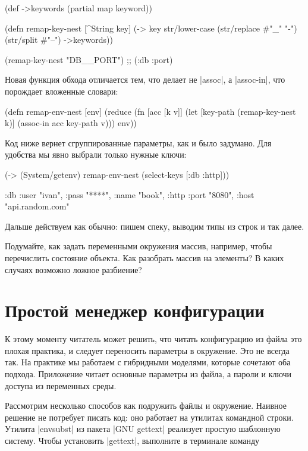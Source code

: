 \begin{code}
(def ->keywords (partial map keyword))

(defn remap-key-nest
  [^String key]
  (-> key
      str/lower-case
      (str/replace #"_" "-")
      (str/split #"--")
      ->keywords))

(remap-key-nest "DB__PORT")
;; (:db :port)
\end{code}

Новая функция обхода отличается тем, что делает не \spverb|assoc|, а \spverb|assoc-in|, что
порождает вложенные словари:

\begin{code}
(defn remap-env-nest
  [env]
  (reduce
   (fn [acc [k v]]
     (let [key-path (remap-key-nest k)]
       (assoc-in acc key-path v)))
   {}
   env))
\end{code}

Код ниже вернет сгруппированные параметры, как и было задумано. Для удобства мы
явно выбрали только нужные ключи:

\begin{code}
(-> (System/getenv)
    remap-env-nest
    (select-keys [:db :http]))

{:db {:user "ivan", :pass "****", :name "book"},
 :http {:port "8080", :host "api.random.com"}}
\end{code}

Дальше действуем как обычно: пишем спеку, выводим типы из строк и так далее.

Подумайте, как задать переменными окружения массив, например, чтобы перечислить
состояние объекта. Как разобрать массив на элементы? В каких случаях возможно
ложное разбиение?

\section{Простой менеджер конфигурации}

К этому моменту читатель может решить, что читать конфигурацию из файла это
плохая практика, и следует переносить параметры в окружение. Это не всегда
так. На практике мы работаем с гибридными моделями, которые сочетают оба
подхода. Приложение читает основные параметры из файла, а пароли и ключи доступа
из переменных среды.

Рассмотрим несколько способов как подружить файлы и окружение. Наивное решение
не потребует писать код: оно работает на утилитах командной строки. Утилита
\spverb|envsubst| из пакета \spverb|GNU gettext| реализует простую шаблонную систему. Чтобы
установить \spverb|gettext|, выполните в терминале команду

